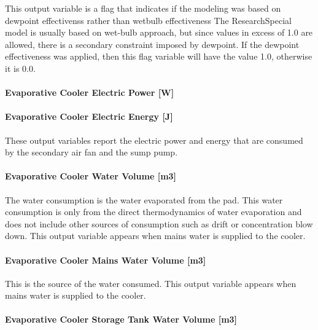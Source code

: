 This output variable is a flag that indicates if the modeling was based on dewpoint effectivenss rather than wetbulb effectiveness The ResearchSpecial model is usually based on wet-bulb approach, but since values in excess of 1.0 are allowed, there is a secondary constraint imposed by dewpoint. If the dewpoint effectiveness was applied, then this flag variable will have the value 1.0, otherwise it is 0.0.

\paragraph{Evaporative Cooler Electric Power {[}W{]}}\label{evaporative-cooler-electric-power-w-1}

\paragraph{Evaporative Cooler Electric Energy {[}J{]}}\label{evaporative-cooler-electric-energy-j-4}

These output variables report the electric power and energy that are consumed by the secondary air fan and the sump pump.

\paragraph{Evaporative Cooler Water Volume {[}m3{]}}\label{evaporative-cooler-water-volume-m3-3}

The water consumption is the water evaporated from the pad. This water consumption is only from the direct thermodynamics of water evaporation and does not include other sources of consumption such as drift or concentration blow down. This output variable appears when mains water is supplied to the cooler.

\paragraph{Evaporative Cooler Mains Water Volume {[}m3{]}}\label{evaporative-cooler-mains-water-volume-m3-4}

This is the source of the water consumed. This output variable appears when mains water is supplied to the cooler.

\paragraph{Evaporative Cooler Storage Tank Water Volume {[}m3{]}}\label{evaporative-cooler-storage-tank-water-volume-m3-4}

